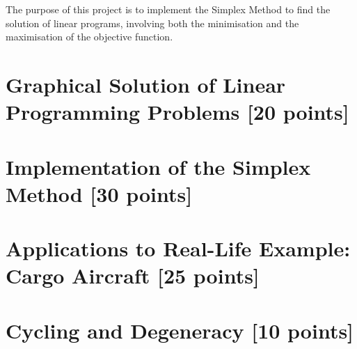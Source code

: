 \documentclass[unicode,11pt,a4paper,oneside,numbers=endperiod,openany]{scrartcl}
\begin{document}
\setassignment
{}

\newline

\assignmentpolicy


The purpose of this project is to implement the Simplex Method to find the solution of linear programs, involving both the minimisation and the maximisation of the objective function.

\section{Graphical Solution of Linear Programming Problems [20 points]}


\section{Implementation of the Simplex Method [30 points]}


\section{Applications to Real-Life Example: Cargo Aircraft [25 points]}


\section{Cycling and Degeneracy [10 points]}
\end{document}
